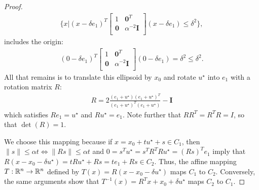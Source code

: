 \begin{proof}
\begin{align*}
\bigg \{x \bigg | (x - \delta e_1)^T\begin{bmatrix}
1 & \boldsymbol0^T \\
\boldsymbol 0 & \alpha^{-2} \boldsymbol I \\
\end{bmatrix}(x - \delta e_1) \le \delta^2 \bigg\},
\end{align*}
includes the origin:
\begin{align*}
(0 - \delta e_1)^T\begin{bmatrix}
1 & \boldsymbol0^T \\
\boldsymbol 0 & \alpha^{-2} \boldsymbol I \\
\end{bmatrix}(0 - \delta e_1) = \delta^2 \le \delta^2.
\end{align*}
All that remains is to translate this ellipsoid by $x_0$ and rotate $u^{\star}$ into $e_1$ with a rotation matrix $R$:
\begin{align*}
R = 2\frac{(e_1 + u^{\star})(e_1 +u^{\star})^T}{(e_1 +u^{\star})^T(e_1 +u^{\star})} - \boldsymbol I
\end{align*}
which satisfies $Re_1 = u^{\star}$ and $Ru^{\star} = e_1$.
Note further that $RR^T = R^TR = I$, so that $\det(R) = 1$.

We choose this mapping because if $x = x_0 + t u^{\star} + s \in C_1$,
then $\|s\|\le \alpha t \Leftrightarrow \|Rs\| \le \alpha t$ and $0 = s^Tu^{\star} = s^T R^T R u^{\star} = (Rs)^T e_1$ imply that 
$R(x - x_0 - \delta u^{\star}) = t Ru^{\star} + Rs = t e_1 + Rs \in C_2$.
Thus, the affine mapping $T : \mathbb R^n \to \mathbb R^n$ defined by $T(x) = R(x - x_0 - \delta u^{\star})$ maps $C_1$ to $C_2$.
Conversely, the same arguments show that $T^{-1}(x) = R^Tx + x_0 + \delta u^{\star}$ maps $C_2$ to $C_1$.



\end{proof}
